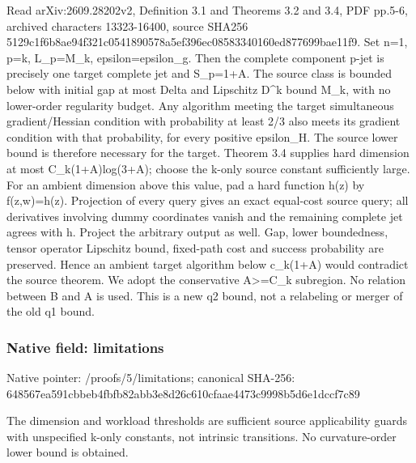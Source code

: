 \documentclass[10pt,a4paper]{article}
\begin{document}
\begingroup\raggedright\sloppy Read arXiv:\allowbreak{}2609.28202v2,\allowbreak{} Definition 3.1 and Theorems 3.2 and 3.4,\allowbreak{} PDF pp.5-6,\allowbreak{} archived characters 13323-16400,\allowbreak{} source SHA256 5129c1f6b8ae94f321c0541890578a5ef396ec08583340160ed877699bae11f9. Set n=\allowbreak{}1,\allowbreak{} p=\allowbreak{}k,\allowbreak{} L\_\allowbreak{}p=\allowbreak{}M\_\allowbreak{}k,\allowbreak{} epsilon=\allowbreak{}epsilon\_\allowbreak{}g. Then the complete component p-jet is precisely one target complete jet and S\_\allowbreak{}p=\allowbreak{}1+A. The source class is bounded below with initial gap at most Delta and Lipschitz D\textasciicircum{}k bound M\_\allowbreak{}k,\allowbreak{} with no lower-order regularity budget. Any algorithm meeting the target simultaneous gradient/\allowbreak{}Hessian condition with probability at least 2/\allowbreak{}3 also meets its gradient condition with that probability,\allowbreak{} for every positive epsilon\_\allowbreak{}H. The source lower bound is therefore necessary for the target. Theorem 3.4 supplies hard dimension at most C\_\allowbreak{}k(1+A)log(3+A);\allowbreak{} choose the k-only source constant sufficiently large. For an ambient dimension above this value,\allowbreak{} pad a hard function h(z) by f(z,\allowbreak{}w)=\allowbreak{}h(z). Projection of every query gives an exact equal-cost source query;\allowbreak{} all derivatives involving dummy coordinates vanish and the remaining complete jet agrees with h. Project the arbitrary output as well. Gap,\allowbreak{} lower boundedness,\allowbreak{} tensor operator Lipschitz bound,\allowbreak{} fixed-path cost and success probability are preserved. Hence an ambient target algorithm below c\_\allowbreak{}k(1+A) would contradict the source theorem. We adopt the conservative A>=\allowbreak{}C\_\allowbreak{}k subregion. No relation between B and A is used. This is a new q2 bound,\allowbreak{} not a relabeling or merger of the old q1 bound.\par\endgroup

\subsubsection{Native field: limitations}
Native pointer: /proofs/5/limitations; canonical SHA-256: 648567ea591cbbeb4fbfb82abb3e8d26c610cfaae4473c9998b5d6e1dccf7c89

\begingroup\raggedright\sloppy The dimension and workload thresholds are sufficient source applicability guards with unspecified k-only constants,\allowbreak{} not intrinsic transitions. No curvature-order lower bound is obtained.\par\endgroup
\end{document}
